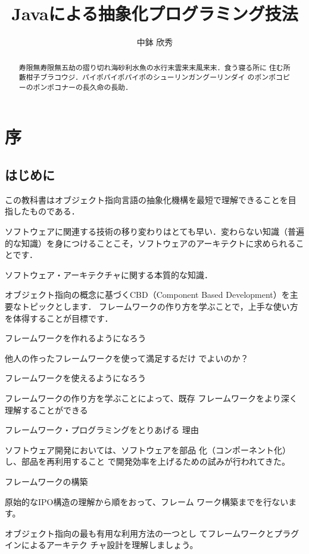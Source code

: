 \documentclass[a4j,papersize]{jsbook}
\title{Javaによる抽象化プログラミング技法}
\author{中鉢 欣秀}
\begin{document}
\maketitle

\chapter*{序}

\begin{abstract}
寿限無寿限無五劫の摺り切れ海砂利水魚の水行末雲来末風来末．食う寝る所に
住む所藪柑子ブラコウジ．パイポパイポパイポのシューリンガングーリンダイ
のポンポコピーのポンポコナーの長久命の長助．
\end{abstract}

\section*{はじめに}

この教科書はオブジェクト指向言語の抽象化機構を最短で理解できることを目
指したものである．

ソフトウェアに関連する技術の移り変わりはとても早い．変わらない知識（普遍的な知識）を身につけることこそ，ソフトウェアのアーキテクトに求められることです．

ソフトウェア・アーキテクチャに関する本質的な知識．

オブジェクト指向の概念に基づくCBD（Component Based Development）を主要なトピックとします．
フレームワークの作り方を学ぶことで，上手な使い方を体得することが目標です．

フレームワークを作れるようになろう 

他人の作ったフレームワークを使って満足するだけ
でよいのか？ 

フレームワークを使えるようになろう 

フレームワークの作り方を学ぶことによって、既存
フレームワークをより深く理解することができる 

フレームワーク・プログラミングをとりあげる
理由 

ソフトウェア開発においては、ソフトウェアを部品
化（コンポーネント化）し、部品を再利用すること
で開発効率を上げるための試みが行われてきた。 

フレームワークの構築 

原始的なIPO構造の理解から順をおって、フレーム
ワーク構築までを行ないます。 

オブジェクト指向の最も有用な利用方法の一つとし
てフレームワークとプラグインによるアーキテク
チャ設計を理解しましょう。 
\end{document}

